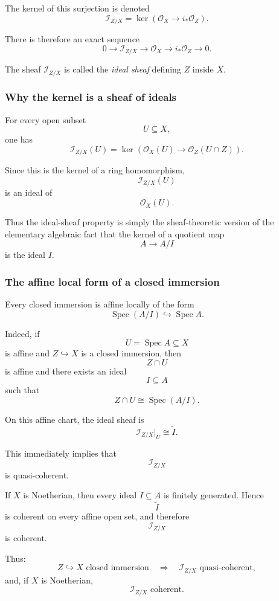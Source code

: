 \documentclass[12pt,a4paper]{article}
\DeclareMathOperator{\Spec}{Spec}
\newcommand{\OO}{\mathcal{O}}
\providecommand{\Spec}{\operatorname{Spec}}
\theoremstyle{notespace}
\begin{document}
The kernel of this surjection is denoted
\[
\mathcal{I}_{Z/X}
=
\ker\!\left(
\OO_X\longrightarrow i_*\OO_Z
\right).
\]

There is therefore an exact sequence
\[
0
\longrightarrow
\mathcal{I}_{Z/X}
\longrightarrow
\OO_X
\longrightarrow
i_*\OO_Z
\longrightarrow
0.
\]

The sheaf \(\mathcal{I}_{Z/X}\) is called the \emph{ideal sheaf} defining \(Z\) inside \(X\).

\subsubsection{Why the kernel is a sheaf of ideals}

For every open subset
\[
U\subseteq X,
\]
one has
\[
\mathcal{I}_{Z/X}(U)
=
\ker\!\left(
\OO_X(U)
\longrightarrow
\OO_Z(U\cap Z)
\right).
\]

Since this is the kernel of a ring homomorphism,
\[
\mathcal{I}_{Z/X}(U)
\]
is an ideal of
\[
\OO_X(U).
\]

Thus the ideal-sheaf property is simply the sheaf-theoretic version of the elementary algebraic fact that the kernel of a quotient map
\[
A\longrightarrow A/I
\]
is the ideal \(I\).

\subsubsection{The affine local form of a closed immersion}

Every closed immersion is affine locally of the form
\[
\Spec(A/I)\hookrightarrow\Spec A.
\]

Indeed, if
\[
U=\Spec A\subseteq X
\]
is affine and \(Z\hookrightarrow X\) is a closed immersion, then
\[
Z\cap U
\]
is affine and there exists an ideal
\[
I\subseteq A
\]
such that
\[
Z\cap U\cong\Spec(A/I).
\]

On this affine chart, the ideal sheaf is
\[
\mathcal{I}_{Z/X}|_U\cong\widetilde I.
\]

This immediately implies that
\[
\mathcal{I}_{Z/X}
\]
is quasi-coherent.

If \(X\) is Noetherian, then every ideal \(I\subseteq A\) is finitely generated. Hence
\[
\widetilde I
\]
is coherent on every affine open set, and therefore
\[
\mathcal{I}_{Z/X}
\]
is coherent.

Thus:
\[
\boxed{
	Z\hookrightarrow X\text{ closed immersion}
	\quad\Longrightarrow\quad
	\mathcal{I}_{Z/X}\text{ quasi-coherent},
}
\]
and, if \(X\) is Noetherian,
\[
\boxed{
	\mathcal{I}_{Z/X}\text{ coherent}.
}
\]
\end{document}
